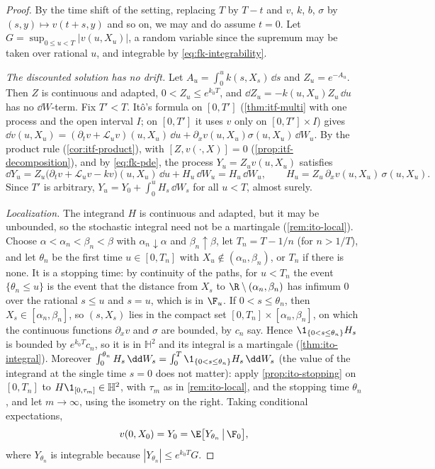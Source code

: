 \begin{proof}
By the time shift of the setting, replacing $T$ by $T-t$ and $v$, $k$, $b$, $\sigma$ by
$(s,y)\mapsto v(t+s,y)$ and so on, we may and do assume $t=0$. Let
$G=\sup_{0\le u<T}|v(u,X_u)|$, a random variable since the supremum may be taken over rational
$u$, and integrable by \eqref{eq:fk-integrability}.

\emph{The discounted solution has no drift.} Let $A_u=\int_0^uk(s,X_s)\,\dd s$ and
$Z_u=e^{-A_u}$. Then $Z$ is continuous and adapted, $0<Z_u\le e^{k_0T}$, and
$\dd Z_u=-k(u,X_u)Z_u\,\dd u$ has no $\dd W$-term. Fix $T'<T$. It\^o's formula on $[0,T']$
(\cref{thm:itf-multi} with one process and the open interval $I$; on $[0,T']$ it uses $v$ only
on $[0,T']\times I$) gives
$\dd v(u,X_u)=(\partial_tv+\mathcal L_uv)(u,X_u)\,\dd u+\partial_xv(u,X_u)\sigma(u,X_u)\,\dd W_u$.
By the product rule (\cref{cor:itf-product}), with $[Z,v(\cdot,X)]=0$
(\cref{prop:itf-decomposition}), and by \eqref{eq:fk-pde}, the process $Y_u=Z_uv(u,X_u)$
satisfies
\[
  \dd Y_u=Z_u\big(\partial_tv+\mathcal L_uv-kv\big)(u,X_u)\,\dd u+H_u\,\dd W_u=H_u\,\dd W_u,
  \qquad H_u=Z_u\,\partial_xv(u,X_u)\,\sigma(u,X_u).
\]
Since $T'$ is arbitrary, $Y_u=Y_0+\int_0^uH_s\,\dd W_s$ for all $u<T$, almost surely.

\emph{Localization.} The integrand $H$ is continuous and adapted, but it may be unbounded, so
the stochastic integral need not be a martingale (\cref{rem:ito-local}). Choose
$\alpha<\alpha_n<\beta_n<\beta$ with $\alpha_n\downarrow\alpha$ and $\beta_n\uparrow\beta$, let
$T_n=T-1/n$ (for $n>1/T$), and let $\theta_n$ be the first time $u\in[0,T_n]$ with
$X_u\notin(\alpha_n,\beta_n)$, or $T_n$ if there is none. It is a stopping time: by continuity of
the paths, for $u<T_n$ the event $\{\theta_n\le u\}$ is the event that the distance from $X_s$ to
$\R\setminus(\alpha_n,\beta_n)$ has infimum $0$ over the rational $s\le u$ and $s=u$, which is in
$\F_u$. If $0<s\le\theta_n$, then $X_s\in[\alpha_n,\beta_n]$, so $(s,X_s)$ lies in the compact set
$[0,T_n]\times[\alpha_n,\beta_n]$, on which the continuous functions $\partial_xv$ and $\sigma$ are
bounded, by $c_n$ say. Hence $\1_{\{0<s\le\theta_n\}}H_s$ is bounded by $e^{k_0T}c_n$, so it is
in $\mathbb H^2$ and its integral is a martingale (\cref{thm:ito-integral}). Moreover
$\int_0^{\theta_n}H_s\,\dd W_s=\int_0^T\1_{\{0<s\le\theta_n\}}H_s\,\dd W_s$ (the value of the
integrand at the single time $s=0$ does not matter): apply \cref{prop:ito-stopping} on $[0,T_n]$ to
$H\1_{[0,\tau_m]}\in\mathbb H^2$, with $\tau_m$ as in \cref{rem:ito-local}, and the stopping time
$\theta_n$, and let $m\to\infty$, using the isometry on the right. Taking conditional expectations,
\[
  v(0,X_0)=Y_0=\E\big[Y_{\theta_n}\,\big|\,\F_0\big],
\]
where $Y_{\theta_n}$ is integrable because $|Y_{\theta_n}|\le e^{k_0T}G$.


\end{proof}
